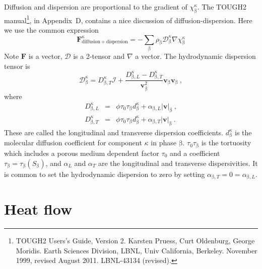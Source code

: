 \documentclass[12pt]{report}
\def\species{\kappa}
\def\phase{\mathrm{\beta}}
\def\massfrac{\chi}
\def\flux{\mathbf{F}}
\def\darcyvel{\mathbf{v}}
\begin{document}
Diffusion and dispersion are proportional to the gradient of
$\massfrac_{\phase}^{\species}$.  The TOUGH2 manual\footnote{TOUGH2
  Users's Guide, Version 2.  Karsten Pruess, Curt Oldenburg, George
  Moridis.  Earth Sciences Division, LBNL, Univ California, Berkeley.
  November 1999, revised August 2011.  LBNL-43134 (revised).}, in
Appendix~D, contains a nice discussion of diffusion-dispersion.  Here
we use the common expression
\begin{equation}
\flux^{\species}_{\mathrm{diffusion+dispersion}} =
-\sum_{\phase}\rho_{\phase}{\mathcal{D}}_{\phase}^{\species}\nabla
\massfrac_{\phase}^{\species}
\label{diff.disp.eqn}
\end{equation}
Note $\flux$ is a vector, ${\mathcal{D}}$ is a 2-tensor and $\nabla$ a
vector.  The hydrodynamic dispersion tensor is
\begin{equation}
{\mathcal{D}}_{\phase}^{\species} = D_{\phase,T}^{\species}{\mathcal{I}} +
\frac{D_{\phase,L}^{\species} - D_{\phase,
    T}^{\species}}{\darcyvel_{\phase}^{2}}\darcyvel_{\phase}\darcyvel_{\phase}
\ ,
\label{hydro.disp.t.eqn}
\end{equation}
where
\begin{eqnarray}
D_{\phase,L}^{\species} & = & \phi\tau_{0}\tau_{\phase}d_{\phase}^{\species}
+ \alpha_{\phase, L}\left|\darcyvel\right|_{\phase}
\ , \label{dl.eqn} \\
D_{\phase,T}^{\species} & = & \phi\tau_{0}\tau_{\phase}d_{\phase}^{\species}
+ \alpha_{\phase, T}\left|\darcyvel\right|_{\phase}  \ .
\label{dt.eqn}
\end{eqnarray}
These are called the longitudinal and transverse dispersion
coefficients.  $d_{\phase}^{\species}$ is the molecular diffusion
coefficient for component $\species$ in phase $\phase$.
$\tau_{0}\tau_{\phase}$ is the tortuosity which includes a porous
medium dependent factor $\tau_{0}$ and a coefficient $\tau_{\phase} =
\tau_{\phase}(S_{\phase})$, and $\alpha_{L}$ and $\alpha_{T}$ are the
longitudinal and transverse dispersivities.  It
is common to set the hydrodynamic dispersion to zero by setting
$\alpha_{\phase, T} = 0 = \alpha_{\phase, L}$.




\section{Heat flow}
\end{document}
